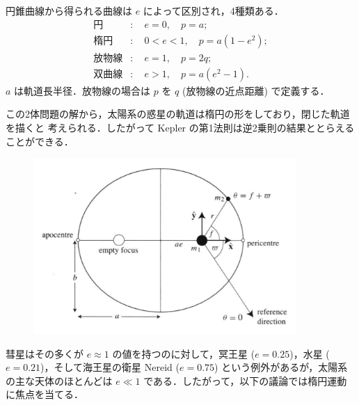 \documentclass[11pt,a4paper,oneside,onecolumn]{jarticle}
\begin{document}
円錐曲線から得られる曲線は $e$ によって区別され，4種類ある．
\begin{equation}
\begin{split}
円 &: \quad e = 0, \quad p = a; \\
楕円 &: \quad 0 < e < 1, \quad p = a(1-e^2); \\
放物線 &: \quad e = 1, \quad p = 2q; \\
双曲線 &: \quad e > 1, \quad p = a(e^2-1). 
\end{split}
\end{equation}
$a$ は軌道長半径．放物線の場合は $p$ を $q$ (放物線の近点距離) で定義する．

この2体問題の解から，太陽系の惑星の軌道は楕円の形をしており，閉じた軌道を描くと
考えられる．したがって Kepler の第1法則は逆2乗則の結果ととらえることができる．

\begin{figure}[H]
\centering
\includegraphics[width=10cm]{./image/sec2_5.pdf}
\caption{\label{fig:ellipse}}
\end{figure}

彗星はその多くが $e \approx 1$ の値を持つのに対して，冥王星 ($e = 0.25$)，水星 ($e = 0.21$)，そして海王星の衛星 Nereid ($e = 0.75$) という例外があるが，太陽系の主な天体のほとんどは $e \ll 1$ である．したがって，以下の議論では楕円運動に焦点を当てる．
\end{document}
